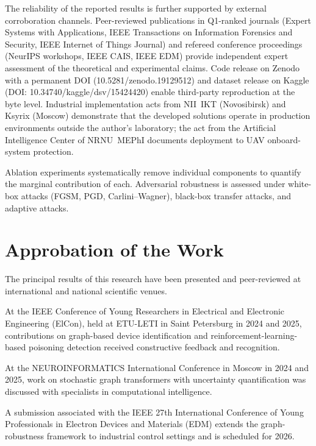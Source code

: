 The reliability of the reported results is further supported by external corroboration channels. Peer-reviewed publications in Q1-ranked journals (Expert Systems with Applications, IEEE Transactions on Information Forensics and Security, IEEE Internet of Things Journal) and refereed conference proceedings (NeurIPS workshops, IEEE CAIS, IEEE EDM) provide independent expert assessment of the theoretical and experimental claims. Code release on Zenodo with a permanent DOI (10.5281/zenodo.19129512) and dataset release on Kaggle (DOI: 10.34740/kaggle/dsv/15424420) enable third-party reproduction at the byte level. Industrial implementation acts from NII~IKT (Novosibirsk) and Ksyrix (Moscow) demonstrate that the developed solutions operate in production environments outside the author's laboratory; the act from the Artificial Intelligence Center of NRNU~MEPhI documents deployment to UAV onboard-system protection.

Ablation experiments systematically remove individual components to quantify the marginal contribution of each. Adversarial robustness is assessed under white-box attacks (FGSM, PGD, Carlini--Wagner), black-box transfer attacks, and adaptive attacks.

\section*{Approbation of the Work}

The principal results of this research have been presented and peer-reviewed at international and national scientific venues.

At the IEEE Conference of Young Researchers in Electrical and Electronic Engineering (ElCon), held at ETU-LETI in Saint Petersburg in 2024 and 2025, contributions on graph-based device identification and reinforcement-learning-based poisoning detection received constructive feedback and recognition.

At the NEUROINFORMATICS International Conference in Moscow in 2024 and 2025, work on stochastic graph transformers with uncertainty quantification was discussed with specialists in computational intelligence.

A submission associated with the IEEE 27th International Conference of Young Professionals in Electron Devices and Materials (EDM) extends the graph-robustness framework to industrial control settings and is scheduled for 2026.

